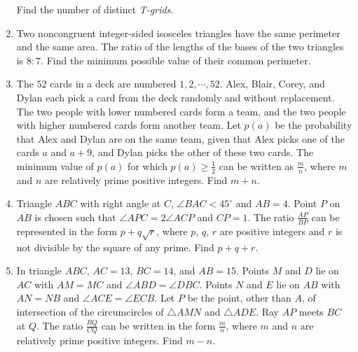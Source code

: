 \documentclass{article}
\begin{document}
\begin{enumerate}[label=\arabic*., itemsep=0.5em]
Find the number of distinct \textit{T-grids}.\par \vspace{0.5em}\item Two noncongruent integer-sided isosceles triangles have the same perimeter and the same area. The ratio of the lengths of the bases of the two triangles is \(8: 7\). Find the minimum possible value of their common perimeter.\par \vspace{0.5em}\item The \(52\) cards in a deck are numbered \(1, 2, \cdots, 52\). Alex, Blair, Corey, and Dylan each pick a card from the deck randomly and without replacement. The two people with lower numbered cards form a team, and the two people with higher numbered cards form another team. Let \(p(a)\) be the probability that Alex and Dylan are on the same team, given that Alex picks one of the cards \(a\) and \(a+9\), and Dylan picks the other of these two cards. The minimum value of \(p(a)\) for which \(p(a)\ge\frac{1}{2}\) can be written as \(\frac{m}{n}\), where \(m\) and \(n\) are relatively prime positive integers. Find \(m+n\).\par \vspace{0.5em}\item Triangle \(ABC\) with right angle at \(C\), \(\angle BAC < 45^\circ\) and \(AB = 4\). Point \(P\) on \(\overline{AB}\) is chosen such that \(\angle APC = 2\angle ACP\) and \(CP = 1\). The ratio \(\frac{AP}{BP}\) can be represented in the form \(p + q\sqrt{r}\), where \(p\), \(q\), \(r\) are positive integers and \(r\) is not divisible by the square of any prime. Find \(p+q+r\).\par \vspace{0.5em}\item In triangle \(ABC\), \(AC=13\), \(BC=14\), and \(AB=15\). Points \(M\) and \(D\) lie on \(AC\) with \(AM=MC\) and \(\angle ABD = \angle DBC\). Points \(N\) and \(E\) lie on \(AB\) with \(AN=NB\) and \(\angle ACE = \angle ECB\). Let \(P\) be the point, other than \(A\), of intersection of the circumcircles of \(\triangle AMN\) and \(\triangle ADE\). Ray \(AP\) meets \(BC\) at \(Q\). The ratio \(\frac{BQ}{CQ}\) can be written in the form \(\frac{m}{n}\), where \(m\) and \(n\) are relatively prime positive integers. Find \(m-n\).\par \vspace{0.5em}\end{enumerate}
\end{document}
